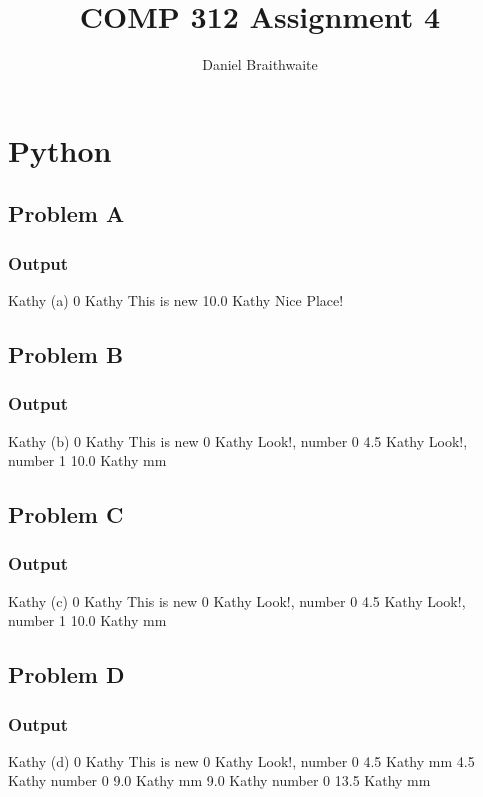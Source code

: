 \documentclass{article}
\title{COMP 312 Assignment 4}
\author{Daniel Braithwaite}
\begin{document}
	\maketitle
	\newpage
  	
  	\section{Python}
  		\subsection{Problem A}
  			
  			
  			\subsubsection{Output}
  				Kathy (a)
				0 Kathy  This is new
				10.0 Kathy  Nice Place!
  			
  		\subsection{Problem B}
  			
  			
  			\subsubsection{Output}
  				Kathy (b)
				0 Kathy  This is new
				0 Kathy  Look!, number 0
				4.5 Kathy  Look!, number 1
				10.0 Kathy mm

  			
  		\subsection{Problem C}
  			
  			
  			\subsubsection{Output}
  				Kathy (c)
				0 Kathy  This is new
				0 Kathy  Look!, number 0
				4.5 Kathy  Look!, number  1
				10.0 Kathy mm

  			
  		\subsection{Problem D}
  			
  			
  			\subsubsection{Output}
				Kathy (d)
				0 Kathy  This is new
				0 Kathy  Look!, number 0
				4.5 Kathy mm
				4.5 Kathy  number 0
				9.0 Kathy mm
				9.0 Kathy  number 0
				13.5 Kathy mm
		
\end{document}
